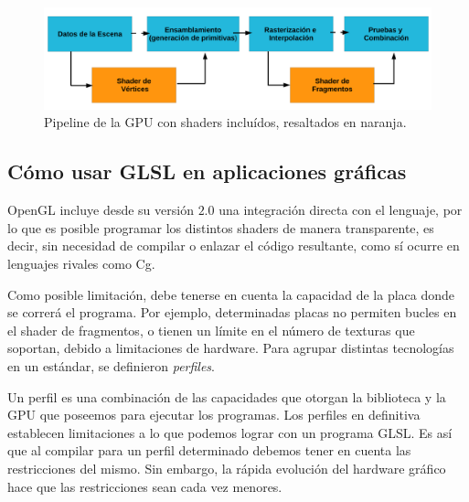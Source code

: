 \begin{figure}[h]
\begin{center}
\includegraphics[width=13cm]{figures/pipelinegrafico}
\end{center}
\caption[Pipeline de la GPU con shaders incluídos]{Pipeline de la GPU con shaders incluídos, resaltados en naranja.}
\label{fg:pipelinegrafico}
\end{figure}


\subsection{C\'omo usar GLSL en aplicaciones gr\'aficas}
OpenGL incluye desde su versión $2.0$ una integración directa con el lenguaje, por lo que es posible programar los distintos shaders de manera transparente, es decir, sin necesidad de compilar o enlazar el código resultante, como sí ocurre en lenguajes rivales como Cg.

Como posible limitación, debe tenerse en cuenta la capacidad de la placa donde se correrá el programa.
Por ejemplo, determinadas placas no permiten bucles en el shader de fragmentos, o tienen un límite en el número de texturas que soportan, debido a limitaciones de hardware.
Para agrupar distintas tecnologías en un estándar, se definieron {\em perfiles}.

Un perfil es una combinaci\'on de las capacidades que otorgan la biblioteca y la GPU que poseemos para ejecutar los programas. Los perfiles en definitiva establecen limitaciones a lo que podemos lograr con un programa GLSL. Es as\'i que al compilar para un perfil determinado debemos tener en cuenta las restricciones del mismo. Sin embargo, la r\'apida evoluci\'on del hardware gr\'afico hace que las restricciones sean cada vez menores.


